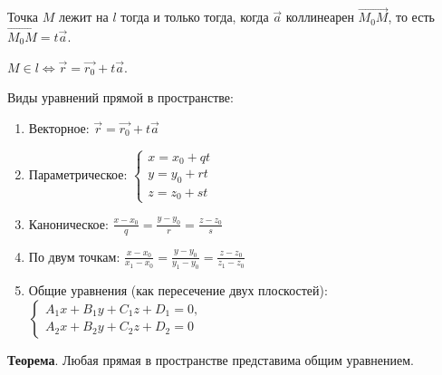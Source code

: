 \documentclass[a4paper]{article}
\begin{document}
    Точка $M$ лежит на $l$ тогда и только тогда, когда $\vec{a}$ коллинеарен $\overrightarrow{M_0M}$, то есть $\overrightarrow{M_0M}  = t\vec{a}$.

    $M \in l \Leftrightarrow \vec{r} = \vec{r_0} + t\vec{a}$.

    Виды уравнений прямой в пространстве:
    \begin{enumerate}
        \item Векторное: $\vec{r} = \vec{r_0} + t\vec{a}$
        \item Параметрическое: $\begin{cases}
                                    x=x_0+qt
                                    \\
                                    y=y_0+rt
                                    \\
                                    z=z_0+st
        \end{cases}$
        \item Каноническое: $\displaystyle \frac{x-x_0}{q} = \frac{y-y_0}{r} = \frac{z-z_0}{s}$
        \item По двум точкам: $\displaystyle \frac{x-x_0}{x_1-x_0} = \frac{y-y_0}{y_1-y_0} = \frac{z-z_0}{z_1-z_0}$
        \item Общие уравнения (как пересечение двух плоскостей): $\begin{cases}
                                                                      A_1x+B_1y+C_1z+D_1=0,
                                                                      \\
                                                                      A_2x+B_2y+C_2z+D_2=0
        \end{cases}$
    \end{enumerate}

    \begin{htheorem}
        \textbf{Теорема}. Любая прямая в пространстве представима общим уравнением.
    \end{htheorem}
\end{document}
